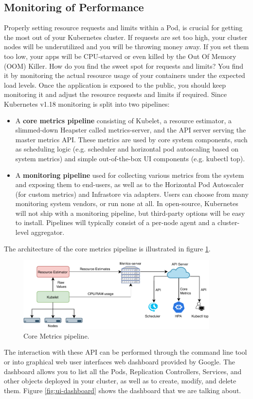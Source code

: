 \subsection{Monitoring of Performance}
Properly setting resource requests and limits within a Pod, is crucial for getting the most out of your Kubernetes cluster. If requests are set too high, your cluster nodes will be underutilized and you will be throwing money away. If you set them too low, your apps will be CPU-starved or even killed by the Out Of Memory (OOM) Killer. How do you find the sweet spot for requests and limits?
You find it by monitoring the actual resource usage of your containers under the expected load levels. Once the application is exposed to the public, you should keep monitoring it and adjust the resource requests and limits if required.
Since Kubernetes v1.18 monitoring is split into two pipelines:
\begin{itemize}
	\item A \textbf{core metrics pipeline} consisting of Kubelet, a resource estimator, a slimmed-down Heapster called metrics-server, and the API server serving the master metrics API. These metrics are used by core system components, such as scheduling logic (e.g. scheduler and horizontal pod autoscaling based on system metrics) and simple out-of-the-box UI components (e.g. kubectl top). 
	\item A \textbf{monitoring pipeline} used for collecting various metrics from the system and exposing them to end-users, as well as to the Horizontal Pod Autoscaler (for custom metrics) and Infrastore via adapters. Users can choose from many monitoring system vendors, or run none at all. In open-source, Kubernetes will not ship with a monitoring pipeline, but third-party options will be easy to install. Pipelines will typically consist of a per-node agent and a cluster-level aggregator. 
\end{itemize}
The architecture of the core metrics pipeline is illustrated in figure \ref{fig:metricspipe}.
\begin{figure}[tbp]
	\centering
	\includegraphics[width=0.9\textwidth]{images/k8smonitor.pdf}
	\caption{Core Metrics pipeline.}
	\label{fig:metricspipe}
\end{figure}
The interaction with these API can be performed through the command line tool or into graphical web user interfaces web dashboard provided by Google.
The dashboard allows you to list all the Pods, Replication Controllers, Services, and other objects deployed in your cluster, as well as to create, modify, and delete them. Figure \ref{fig:ui-dashboard} shows the dashboard that we are talking about.

